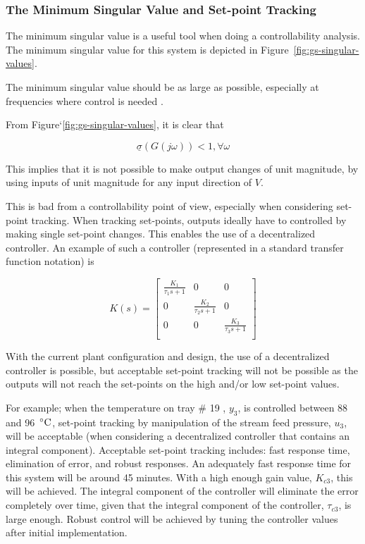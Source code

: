 \subsubsection{The Minimum Singular Value and Set-point Tracking}

The minimum singular value is a useful tool when doing a controllability analysis. The minimum singular value for this system is depicted in Figure~\ref{fig:gs-singular-values}.

The minimum singular value should be as large as possible, especially at frequencies where control is needed \parencite{skogestad}.

From Figure`\ref{fig:gs-singular-values}, it is clear that

\begin{equation}
	\label{eq: Min singular alue criteria}
	\underline{\sigma}(G(j\omega)) < 1 , \forall \omega
\end{equation}

This implies that it is not possible to make output changes of unit magnitude, by using inputs of unit magnitude for any input direction of $V$. 

This is bad from a controllability point of view, especially when considering set-point tracking. When tracking set-points, outputs ideally have to controlled by making single set-point changes. This enables the use of a decentralized controller. An example of such a controller (represented in a standard transfer function notation) is

\begin{equation}
	K(s) = \begin{bmatrix}
	\frac{K_1}{\tau_1s + 1} & 0 & 0\\
	 0 &\frac{K_2}{\tau_2s + 1} & 0\\
	 0 & 0 & \frac{K_3}{\tau_3s + 1}\\
	\end{bmatrix}
\end{equation} 

With the current plant configuration and design, the use of a decentralized controller is possible, but acceptable set-point tracking will not be possible as the outputs will not reach the set-points on the high and/or low set-point values.

For example; when the temperature on tray \# 19 , $y_3$, is controlled between 88 and 96~$\celsius$, set-point tracking by manipulation of the stream feed pressure, $u_3$, will be acceptable (when considering a decentralized controller that contains an integral component). Acceptable set-point tracking includes: fast response time, elimination of error, and robust responses. An adequately fast response time for this system will be around 45 minutes. With a high enough gain value, $K_{c3}$, this will be achieved. The integral component of the controller will eliminate the error completely over time, given that the integral component of the controller, $\tau_{c3}$, is large enough. Robust control will be achieved by tuning the controller values after initial implementation.

